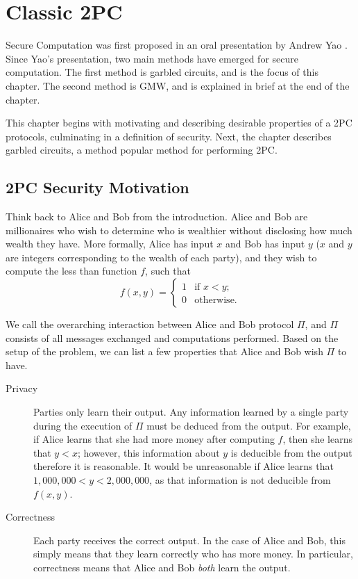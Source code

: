\chapter{Classic 2PC}
Secure Computation was first proposed in an oral presentation by Andrew Yao \cite{yao86}.
Since Yao's presentation, two main methods have emerged for secure computation.
The first method is garbled circuits, and is the focus of this chapter.
The second method is GMW, and is explained in brief at the end of the chapter.

This chapter begins with motivating and describing desirable properties of a 2PC protocols, culminating in a definition of security. 
Next, the chapter describes garbled circuits, a method popular method for performing 2PC.

\section{2PC Security Motivation}
Think back to Alice and Bob from the introduction. 
Alice and Bob are millionaires who wish to determine who is wealthier without disclosing how much wealth they have.
More formally, Alice has input $x$ and Bob has input $y$ ($x$ and $y$ are integers corresponding to the wealth of each party), and they wish to compute the less than function $f$, such that 
\begin{equation}
f(x,y) = \left\{
\begin{array}{lr}
    1 & \text{if } x < y \text{;} \\
    0 & \text{otherwise.}
\end{array}
\right.
\end{equation} 

We call the overarching interaction between Alice and Bob protocol $\Pi$, and $\Pi$ consists of all messages exchanged and computations performed.
Based on the setup of the problem, we can list a few properties that Alice and Bob wish $\Pi$ to have.
\begin{description}
    \item[Privacy] 
        Parties only learn their output. 
        Any information learned by a single party during the execution of $\Pi$ must be deduced from the output. 
        For example, if Alice learns that she had more money after computing $f$, then she learns that $y < x$; however, this information about $y$ is deducible from the output therefore it is reasonable.
        It would be unreasonable if Alice learns that $1,000,000 < y < 2,000,000$, as that information is not deducible from $f(x,y)$.
    \item[Correctness] 
        Each party receives the correct output.
        In the case of Alice and Bob, this simply means that they learn correctly who has more money.
        In particular, correctness means that Alice and Bob \textit{both} learn the output.

\end{description}

